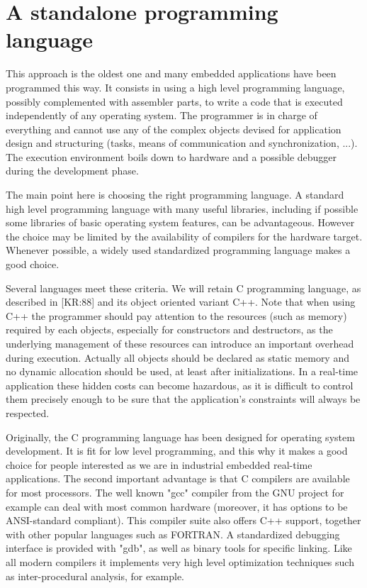 \documentclass[10pt]{report}
\begin{document}
\section{A standalone programming language}

This approach is the oldest one and many embedded applications 
have been programmed this way. It consists in using a high level 
programming language, possibly complemented with assembler parts, 
to write a code that is executed independently of any operating 
system. The programmer is in charge of everything and cannot use 
any of the complex objects devised for application design and 
structuring (tasks, means of communication and synchronization, 
...). The execution environment boils down to hardware and a 
possible debugger during the development phase.

The main point here is choosing the right programming language. A 
standard high level programming language with many useful 
libraries, including if possible some libraries of basic 
operating system features, can be advantageous. However the 
choice may be limited by the availability of compilers for the 
hardware target. Whenever possible, a widely used standardized 
programming language makes a good choice.

Several languages meet these criteria. We will retain C 
programming language, as described in [KR:88] and its object 
oriented variant C++. Note that when using C++ the programmer 
should pay attention to the resources (such as memory) required 
by each objects, especially for constructors and destructors, as 
the underlying management of these resources can introduce an 
important overhead during execution. Actually all objects should 
be declared as static memory and no dynamic allocation should be 
used, at least after initializations. In a real-time application 
these hidden costs can become hazardous, as it is difficult to 
control them precisely enough to be sure that the application's 
constraints will always be respected.

Originally, the C programming language has been designed for 
operating system development. It is fit for low level 
programming, and this why it makes a good choice for people 
interested as we are in industrial embedded real-time 
applications. The second important advantage is that C compilers 
are available for most processors. The well known "gcc" compiler 
from the GNU project for example can deal with most common 
hardware (moreover, it has options to be ANSI-standard 
compliant). This compiler suite also offers C++ support, together 
with other popular languages such as FORTRAN. A standardized 
debugging interface is provided with "gdb", as well as binary 
tools for specific linking. Like all modern compilers it 
implements very high level optimization techniques such as 
inter-procedural analysis, for example.
\end{document}
